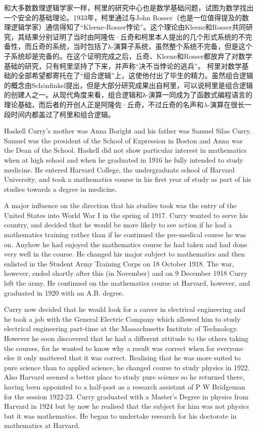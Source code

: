 和大多数数理逻辑学家一样，柯里的研究中心也是数学基础问题，试图为数学找出一个安全的基础理论。1933年，柯里通过与John Rosser（也是一位值得提及的数理逻辑学家）通信得知了“Kleene-Rosser悖论”。这个理论由Kleene和Rosser共同研究，其结果分别证明了当时由阿隆佐·丘奇和柯里本人提出的几个形式系统的不完备性，而丘奇的系统，当时包括了λ-演算子系统，虽然整个系统不完备，但是这个子系统却是完备的。在这个证明完成之后，丘奇、Kleene和Rosser都放弃了对数学基础的研究，只有柯里坚持了下来，并声称“决不当悖论的逃兵”。
柯里对数学基础的全部希望都寄托在了“组合逻辑”上，这使他付出了毕生的精力。虽然组合逻辑的概念由Schönfinkel提出，但是大部分研究成果出自柯里，可以说柯里是组合逻辑的创建人之一。从现代角度来看，组合逻辑和λ-演算一同成为了函数式编程语言的理论基础，而后者的开创人正是阿隆佐·丘奇，不过丘奇的名声和$\lambda$-演算在很长一段时间内都盖过了柯里和组合逻辑。


Haskell Curry's mother was Anna Baright and his father was Samuel Silas Curry. Samuel was the president of the School of Expression in Boston and Anna was the Dean of the School. Haskell did not show particular interest in mathematics when at high school and when he graduated in 1916 he fully intended to study medicine. He entered Harvard College, the undergraduate school of Harvard University, and took a mathematics course in his first year of study as part of his studies towards a degree in medicine.

A major influence on the direction that his studies took was the entry of the United States into World War I in the spring of 1917. Curry wanted to serve his country, and decided that he would be more likely to see action if he had a mathematics training rather than if he continued the pre-medical course he was on. Anyhow he had enjoyed the mathematics course he had taken and had done very well in the course. He changed his major subject to mathematics and then enlisted in the Student Army Training Corps on 18 October 1918. The war, however, ended shortly after this (in November) and on 9 December 1918 Curry left the army. He continued on the mathematics course at Harvard, however, and graduated in 1920 with an A.B. degree.

Curry now decided that he would look for a career in electrical engineering and he took a job with the General Electric Company which allowed him to study electrical engineering part-time at the Massachusetts Institute of Technology. However he soon discovered that he had a different attitude to the others taking the courses, for he wanted to know why a result was correct when for everyone else it only mattered that it was correct. Realising that he was more suited to pure science than to applied science, he changed course to study physics in 1922. Also Harvard seemed a better place to study pure science so he returned there, having been appointed to a half-post as a research assistant of P W Bridgeman for the session 1922-23. Curry graduated with a Master's Degree in physics from Harvard in 1924 but by now he realised that the subject for him was not physics but it was mathematics. He began to undertake research for his doctorate in mathematics at Harvard.

